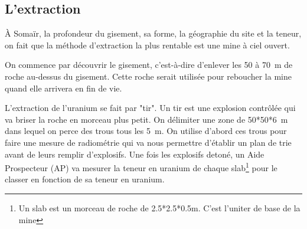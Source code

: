 \subsection{L'extraction}
\label{ssec_extraction}
À Somaïr, la profondeur du gisement, sa forme, la géographie du site et la teneur, on fait que la méthode d'extraction la plus rentable est une mine à ciel ouvert.

On commence par découvrir le gisement, c'est-à-dire d'enlever les 50 à 70~m de roche au-dessus du gisement. Cette roche serait utilisée pour reboucher la mine quand elle arrivera en fin de vie.

L'extraction de l'uranium se fait par "tir". Un tir est une explosion contrôlée qui va briser la roche en morceau plus petit. On délimiter une zone de 50*50*6~m dans lequel on perce des trous tous les 5~m. On utilise d'abord ces trous pour faire une mesure de radiométrie qui va nous permettre d'établir un plan de trie avant de leurs remplir d'explosifs. Une fois les explosifs detoné, un Aide Prospecteur (AP) va mesurer la teneur en uranium de chaque slab\footnote{Un slab est un morceau de roche de 2.5*2.5*0.5m. C'est l'uniter de base de la mine} pour le classer en fonction de sa teneur en uranium.


